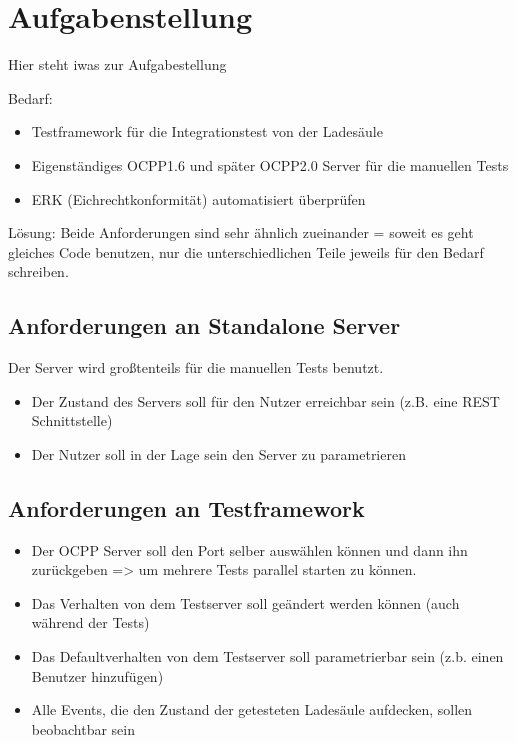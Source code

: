 \section{Aufgabenstellung}

Hier steht iwas zur Aufgabestellung

Bedarf:
\begin{itemize}
    \item Testframework für die Integrationstest von der Ladesäule
    \item Eigenständiges OCPP1.6 und später OCPP2.0 Server für die manuellen Tests
    \item ERK (Eichrechtkonformität) automatisiert überprüfen
\end{itemize}

Lösung:
Beide Anforderungen sind sehr ähnlich zueinander =\> soweit es geht gleiches Code benutzen, nur die unterschiedlichen Teile jeweils für den Bedarf schreiben.

\subsection{Anforderungen an Standalone Server}

    Der Server wird großtenteils für die manuellen Tests benutzt. 

    \begin{itemize}
        \item Der Zustand des Servers soll für den Nutzer erreichbar sein (z.B. eine REST Schnittstelle)
        \item Der Nutzer soll in der Lage sein den Server zu parametrieren
    \end{itemize}

\subsection{Anforderungen an Testframework }
    \begin{itemize}
        \item Der OCPP Server soll den Port selber auswählen können und dann ihn zurückgeben => um mehrere Tests parallel starten zu können.
        \item Das Verhalten von dem Testserver soll geändert werden können (auch während der Tests)
        \item Das Defaultverhalten von dem Testserver soll parametrierbar sein (z.b. einen Benutzer hinzufügen)
        \item Alle Events, die den Zustand der getesteten Ladesäule aufdecken, sollen beobachtbar sein
    \end{itemize}

